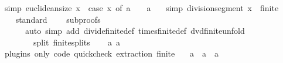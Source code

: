\begin{isabellebody}
\isamarkupfalse%
\ {\isacharbrackleft}{\kern0pt}simp{\isacharbrackright}{\kern0pt}{\isacharcolon}{\kern0pt}\ {\isachardoublequoteopen}euclidean{\isacharunderscore}{\kern0pt}size\ x\ {\isacharequal}{\kern0pt}\ {\isacharparenleft}{\kern0pt}case\ x\ of\ a\ {\isasymRightarrow}\ {}\ {\isacharbar}{\kern0pt}\ a\ {\isasymRightarrow}\ {}{\isacharparenright}{\kern0pt}{\isachardoublequoteclose}\isanewline
{}\isamarkupfalse%
\ {\isacharbrackleft}{\kern0pt}simp{\isacharbrackright}{\kern0pt}{\isacharcolon}{\kern0pt}\ {\isachardoublequoteopen}division{\isacharunderscore}{\kern0pt}segment\ {\isacharparenleft}{\kern0pt}x\ {\isacharcolon}{\kern0pt}{\isacharcolon}{\kern0pt}\ finite{\isacharunderscore}{\kern0pt}{}{\isacharparenright}{\kern0pt}\ {\isacharequal}{\kern0pt}\ {}{\isachardoublequoteclose}\isanewline
{}\isamarkupfalse%
\isanewline
%
\isadelimproof
\ \ %
\endisadelimproof
%
\isatagproof
{}\isamarkupfalse%
\ standard\isanewline
\ \ \ \ {\isacharparenleft}{\kern0pt}subproofs\isanewline
\ \ \ \ \ \ {\isacartoucheopen}auto\ simp\ add{\isacharcolon}{\kern0pt}\ divide{\isacharunderscore}{\kern0pt}finite{\isacharunderscore}{\kern0pt}{}{\isacharunderscore}{\kern0pt}def\ times{\isacharunderscore}{\kern0pt}finite{\isacharunderscore}{\kern0pt}{}{\isacharunderscore}{\kern0pt}def\ dvd{\isacharunderscore}{\kern0pt}finite{\isacharunderscore}{\kern0pt}{}{\isacharunderscore}{\kern0pt}unfold\isanewline
\ \ \ \ \ \ \ \ split{\isacharcolon}{\kern0pt}\ finite{\isacharunderscore}{\kern0pt}{}{\isachardot}{\kern0pt}splits{\isacartoucheclose}{\isacharparenright}{\kern0pt}%
\endisatagproof
{\isafoldproof}%
%
\isadelimproof
\isanewline
%
\endisadelimproof
{}\isamarkupfalse%
\isanewline
\isanewline
\ \isanewline
{}\isamarkupfalse%
\ {\isacharparenleft}{\kern0pt}\ a\ a\isanewline
\isanewline
{}\isamarkupfalse%
\ {\isacharparenleft}{\kern0pt}plugins\ only{\isacharcolon}{\kern0pt}\ code\ {\isachardoublequoteopen}quickcheck{\isachardoublequoteclose}\ extraction{\isacharparenright}{\kern0pt}\ finite{\isacharunderscore}{\kern0pt}{}\ {\isacharequal}{\kern0pt}\isanewline
\ \ a\ {\isacharbar}{\kern0pt}\ a\ {\isacharbar}{\kern0pt}\ a\isanewline

\end{isabellebody}
